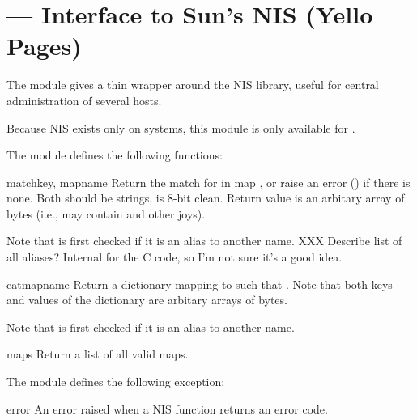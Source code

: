 \section{ ---
         Interface to Sun's NIS (Yello Pages)}


The  module gives a thin wrapper around the NIS library, useful
for central administration of several hosts.

Because NIS exists only on \UNIX{} systems, this module is
only available for \UNIX{}.

The  module defines the following functions:

\begin{funcdesc}{match}{key, mapname}
Return the match for  in map , or raise an
error () if there is none.
Both should be strings,  is 8-bit clean.
Return value is an arbitary array of bytes (i.e., may contain 
and other joys).

Note that  is first checked if it is an alias to another name.
XXX Describe list of all aliases? Internal for the C code, so
    I'm not sure it's a good idea.
\end{funcdesc}

\begin{funcdesc}{cat}{mapname}
Return a dictionary mapping  to  such that
.
Note that both keys and values of the dictionary are arbitary
arrays of bytes.

Note that  is first checked if it is an alias to another name.
\end{funcdesc}

\begin{funcdesc}{maps}{}
Return a list of all valid maps.
\end{funcdesc}


The  module defines the following exception:

\begin{excdesc}{error}
An error raised when a NIS function returns an error code.
\end{excdesc}
